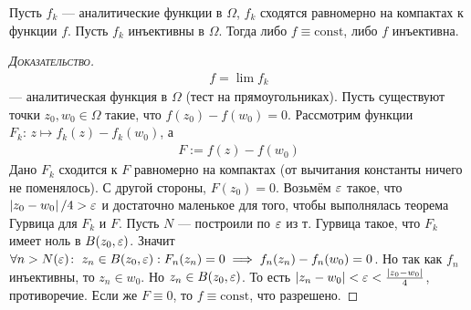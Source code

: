 \documentclass[../complex-analysis.tex]{subfiles}
\begin{document}
 \begin{thm}
  Пусть $ f_k $ --- аналитические функции в $ \Omega $, $ f_k $ сходятся равномерно на компактах к функции $ f $. Пусть $ f_k $ инъективны в $ \Omega $. Тогда либо $ f \equiv \mathrm{const} $, либо $ f $ инъективна.
 \end{thm}
 \begin{proof}[\normalfont\textsc{Доказательство}]
  \begin{align*}
   f = \lim f_k
  \end{align*} --- аналитическая функция в $ \Omega $ (тест на прямоугольниках). Пусть существуют точки $ z_0,w_0 \in \Omega $ такие, что $ f(z_0) - f(w_0) = 0 $. Рассмотрим функции $ F_k \colon\, z \mapsto f_k(z) - f_k(w_0) $, а
  \begin{align*}
   F := f(z) - f(w_0)
  \end{align*} Дано $F_k$ сходится к $ F $ равномерно на компактах (от вычитания константы ничего не поменялось). С другой стороны, $ F(z_0) = 0 $. Возьмём $ \varepsilon $ такое, что $ \left| z_0 - w_0 \right| / 4 > \varepsilon $ и достаточно маленькое для того, чтобы выполнялась теорема Гурвица для $ F_k $ и $ F $. Пусть $ N $ --- построили по $ \varepsilon $ из т. Гурвица такое, что $ F_k $ имеет ноль в $ B(z_0, \varepsilon) $. Значит $ \forall n > N(\varepsilon) \colon\; z_n \in B(z_0,\varepsilon): F_n(z_n) = 0 \implies f_n(z_n) - f_n(w_0) = 0 $. Но так как $ f_n $ инъективны, то $ z_n \in w_0 $. Но $ z_n \in B(z_0, \varepsilon) $. То есть $ \left|z_n - w_0 \right| < \varepsilon < \frac{\left| z_0-w_0 \right|}{4} $, противоречие. Если же $ F \equiv 0 $, то $ f \equiv \mathrm{const} $, что разрешено.
 \end{proof}
 
\end{document}
